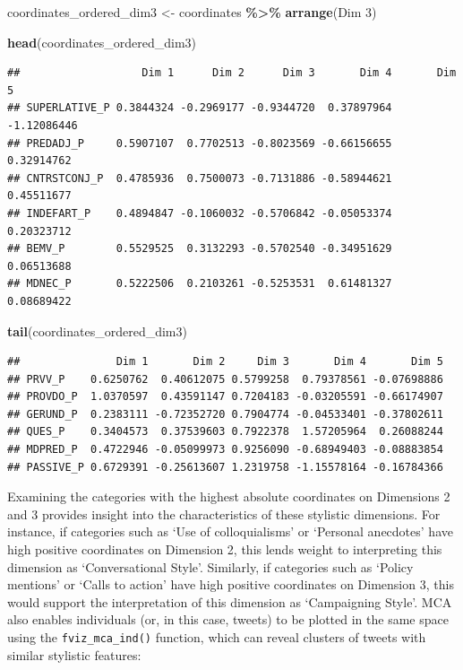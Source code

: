 \documentclass[
]{book}
\newenvironment{Shaded}{\begin{snugshade}}{\end{snugshade}}
\newcommand{\AttributeTok}[1]{\textcolor[rgb]{0.13,0.29,0.53}{#1}}
\newcommand{\FunctionTok}[1]{\textcolor[rgb]{0.13,0.29,0.53}{\textbf{#1}}}
\newcommand{\NormalTok}[1]{#1}
\newcommand{\OtherTok}[1]{\textcolor[rgb]{0.56,0.35,0.01}{#1}}
\newcommand{\SpecialCharTok}[1]{\textcolor[rgb]{0.81,0.36,0.00}{\textbf{#1}}}
\newcommand{\StringTok}[1]{\textcolor[rgb]{0.31,0.60,0.02}{#1}}
\begin{document}
\begin{Shaded}
\begin{Highlighting}[]
\NormalTok{coordinates\_ordered\_dim3 }\OtherTok{\textless{}{-}}\NormalTok{ coordinates }\SpecialCharTok{\%\textgreater{}\%}
    \FunctionTok{arrange}\NormalTok{(}\StringTok{\textasciigrave{}}\AttributeTok{Dim 3}\StringTok{\textasciigrave{}}\NormalTok{)}

\FunctionTok{head}\NormalTok{(coordinates\_ordered\_dim3)}
\end{Highlighting}
\end{Shaded}

\begin{verbatim}
##                   Dim 1      Dim 2      Dim 3       Dim 4       Dim 5
## SUPERLATIVE_P 0.3844324 -0.2969177 -0.9344720  0.37897964 -1.12086446
## PREDADJ_P     0.5907107  0.7702513 -0.8023569 -0.66156655  0.32914762
## CNTRSTCONJ_P  0.4785936  0.7500073 -0.7131886 -0.58944621  0.45511677
## INDEFART_P    0.4894847 -0.1060032 -0.5706842 -0.05053374  0.20323712
## BEMV_P        0.5529525  0.3132293 -0.5702540 -0.34951629  0.06513688
## MDNEC_P       0.5222506  0.2103261 -0.5253531  0.61481327  0.08689422
\end{verbatim}

\begin{Shaded}
\begin{Highlighting}[]
\FunctionTok{tail}\NormalTok{(coordinates\_ordered\_dim3)}
\end{Highlighting}
\end{Shaded}

\begin{verbatim}
##               Dim 1       Dim 2     Dim 3       Dim 4       Dim 5
## PRVV_P    0.6250762  0.40612075 0.5799258  0.79378561 -0.07698886
## PROVDO_P  1.0370597  0.43591147 0.7204183 -0.03205591 -0.66174907
## GERUND_P  0.2383111 -0.72352720 0.7904774 -0.04533401 -0.37802611
## QUES_P    0.3404573  0.37539603 0.7922378  1.57205964  0.26088244
## MDPRED_P  0.4722946 -0.05099973 0.9256090 -0.68949403 -0.08883854
## PASSIVE_P 0.6729391 -0.25613607 1.2319758 -1.15578164 -0.16784366
\end{verbatim}

Examining the categories with the highest absolute coordinates on Dimensions 2 and 3 provides insight into the characteristics of these stylistic dimensions. For instance, if categories such as `Use of colloquialisms' or `Personal anecdotes' have high positive coordinates on Dimension 2, this lends weight to interpreting this dimension as `Conversational Style'. Similarly, if categories such as `Policy mentions' or `Calls to action' have high positive coordinates on Dimension 3, this would support the interpretation of this dimension as `Campaigning Style'. MCA also enables individuals (or, in this case, tweets) to be plotted in the same space using the \texttt{fviz\_mca\_ind()} function, which can reveal clusters of tweets with similar stylistic features:
\end{document}
